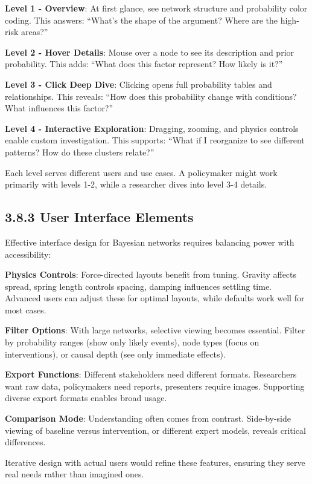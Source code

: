 \documentclass[
  11pt,
  letterpaper,
]{book}
\begin{document}
\textbf{Level 1 - Overview}: At first glance, see network structure and
probability color coding. This answers: ``What's the shape of the
argument? Where are the high-risk areas?''

\textbf{Level 2 - Hover Details}: Mouse over a node to see its
description and prior probability. This adds: ``What does this factor
represent? How likely is it?''

\textbf{Level 3 - Click Deep Dive}: Clicking opens full probability
tables and relationships. This reveals: ``How does this probability
change with conditions? What influences this factor?''

\textbf{Level 4 - Interactive Exploration}: Dragging, zooming, and
physics controls enable custom investigation. This supports: ``What if I
reorganize to see different patterns? How do these clusters relate?''

Each level serves different users and use cases. A policymaker might
work primarily with levels 1-2, while a researcher dives into level 3-4
details.

\subsection{3.8.3 User Interface Elements}\label{sec-ui-elements}

Effective interface design for Bayesian networks requires balancing
power with accessibility:

\textbf{Physics Controls}: Force-directed layouts benefit from tuning.
Gravity affects spread, spring length controls spacing, damping
influences settling time. Advanced users can adjust these for optimal
layouts, while defaults work well for most cases.

\textbf{Filter Options}: With large networks, selective viewing becomes
essential. Filter by probability ranges (show only likely events), node
types (focus on interventions), or causal depth (see only immediate
effects).

\textbf{Export Functions}: Different stakeholders need different
formats. Researchers want raw data, policymakers need reports,
presenters require images. Supporting diverse export formats enables
broad usage.

\textbf{Comparison Mode}: Understanding often comes from contrast.
Side-by-side viewing of baseline versus intervention, or different
expert models, reveals critical differences.

Iterative design with actual users would refine these features, ensuring
they serve real needs rather than imagined ones.
\end{document}
